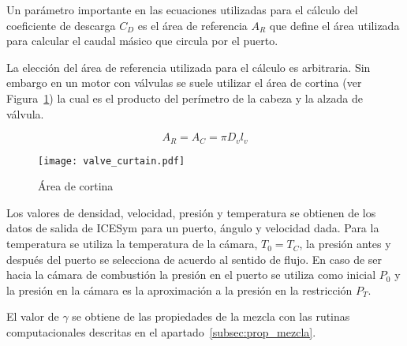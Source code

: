 Un parámetro importante en las ecuaciones utilizadas para el cálculo del
coeficiente de descarga $C_{D}$ es el área de referencia $A_{R}$ que define el
área utilizada para calcular el caudal másico que circula por el puerto.
%

La elección del área de referencia utilizada para el cálculo es arbitraria.
%
Sin embargo en un motor con válvulas se suele utilizar el área de cortina (ver
Figura~\ref{fig:area_cortina}) la cual es el producto del perímetro de la
cabeza y la alzada de válvula.

\begin{equation} \label{eq:area_cortina}
  A_R = A_C = \pi D_v l_v
\end{equation}


\begin{figure} \centering
\texttt{[image: valve\_curtain.pdf]}
  \caption{Área de cortina}\label{fig:area_cortina}
\end{figure}

Los valores de densidad, velocidad, presión y temperatura se obtienen de los
datos de salida de ICESym para un puerto, ángulo y velocidad dada.
%
Para la temperatura se utiliza la temperatura de la cámara, $T_0 = T_C$, la
presión antes y después del puerto se selecciona de acuerdo al sentido de
flujo.
%
En caso de ser hacia la cámara de combustión la presión en el puerto se utiliza
como inicial $P_0$ y la presión en la cámara es la aproximación a la presión en
la restricción $P_T$.
%
%

El valor de $\gamma$ se obtiene de las propiedades de la mezcla con las rutinas
computacionales descritas en el apartado~\ref{subsec:prop_mezcla}.
